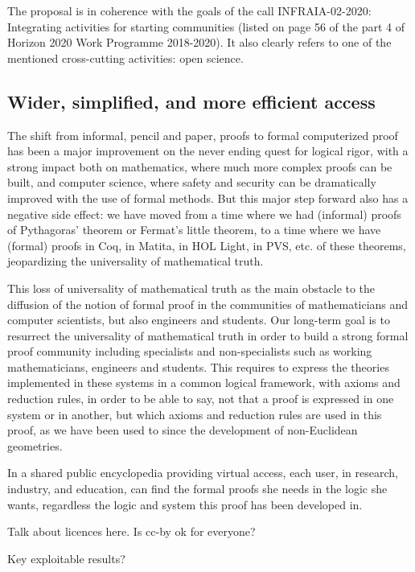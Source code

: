 The proposal is in coherence with the goals of the call INFRAIA-02-2020:
Integrating activities for starting communities (listed on page 56 of
the part 4 of Horizon 2020 Work Programme 2018-2020). It also clearly
refers to one of the mentioned cross-cutting activities: open science.

\subsection{Wider, simplified, and more efficient access}

The shift from informal, pencil and paper, proofs to formal
computerized proof has been a major improvement on the never ending
quest for logical rigor, with a strong impact both on mathematics,
where much more complex proofs can be built, and computer science,
where safety and security can be dramatically improved with the use of
formal methods.  But this major step forward also has a negative side
effect: we have moved from a time where we had (informal) proofs of
Pythagoras' theorem or Fermat's little theorem, to a time where we
have (formal) proofs in {\sc Coq}, in {\sc Matita}, in {\sc HOL
  Light}, in {\sc PVS}, etc.  of these theorems, jeopardizing the
universality of mathematical truth.

This loss of universality of mathematical truth as the main obstacle
to the diffusion of the notion of formal proof in the communities of
mathematicians and computer scientists, but also engineers and
students. Our long-term goal is to resurrect the universality of
mathematical truth in order to build a strong formal proof community
including specialists and non-specialists such as working
mathematicians, engineers and students.  This requires to express the
theories implemented in these systems in a common logical framework,
with axioms and reduction rules, in order to be able to say, not that
a proof is expressed in one system or in another, but which axioms and
reduction rules are used in this proof, as we have been used to since
the development of non-Euclidean geometries.

In a shared public encyclopedia providing virtual access, each user,
in research, industry, and education, can find the formal proofs she
needs in the logic she wants, regardless the logic and system this
proof has been developed in.

{\color{red} Talk about licences here. Is cc-by ok for everyone?}

{\color{red} Key exploitable results?}

